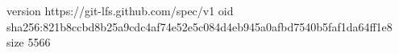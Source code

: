 version https://git-lfs.github.com/spec/v1
oid sha256:821b8ccbd8b25a9cdc4af74e52e5c084d4eb945a0afbd7540b5faf1da64ff1e8
size 5566
